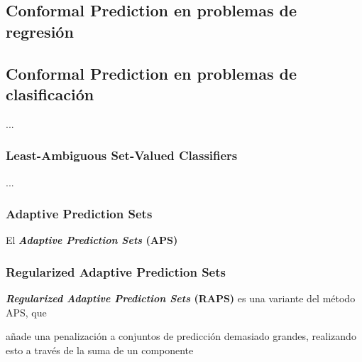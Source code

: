 
\subsection{Conformal Prediction en problemas de regresión}




\subsection{Conformal Prediction en problemas de clasificación}

...

\subsubsection{Least-Ambiguous Set-Valued Classifiers}

...

\subsubsection{Adaptive Prediction Sets}

El \textbf{\textit{Adaptive Prediction Sets} (APS)} \cite{romano2020}

\subsubsection{Regularized Adaptive Prediction Sets}

\textbf{\textit{Regularized Adaptive Prediction Sets} (RAPS)} \cite{angelopoulos2020} es una variante del método APS, 
que 

añade una penalización a conjuntos de predicción demasiado grandes, realizando esto a través 
de la suma de un componente 




